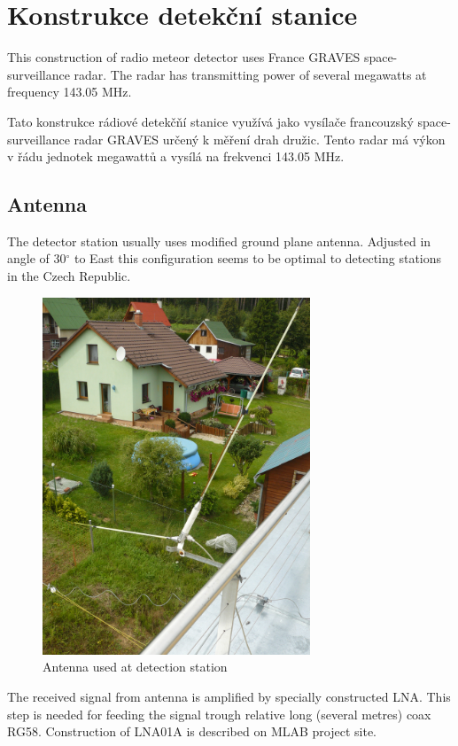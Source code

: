 \documentclass[12pt,a4paper,oneside]{article}
\begin{document}
\section{Konstrukce detekční stanice}

This construction of radio meteor detector uses France GRAVES space-surveillance radar. The radar has transmitting power of several megawatts at frequency 143.05 MHz.   

Tato konstrukce rádiové detekčňí stanice využívá jako vysílače francouzský space-surveillance radar GRAVES určený k měření drah družic. Tento radar má výkon v řádu jednotek megawattů a vysílá na frekvenci 143.05 MHz.

\subsection{Antenna}
The detector station usually uses  modified ground plane antenna. Adjusted in angle of 30$^\circ$ to East this configuration seems to be optimal to detecting stations in the Czech Republic. 

\begin{figure} [htbp]
\begin{center}
\includegraphics [width=80mm] {./img/GP143MHz.JPG} 
\end{center}
\caption{Antenna used at detection station}
\end{figure}

The received signal from antenna is amplified by specially constructed LNA. This step is needed for feeding the signal trough relative long (several metres) coax RG58. Construction of LNA01A is described on MLAB project site. 
\end{document}
